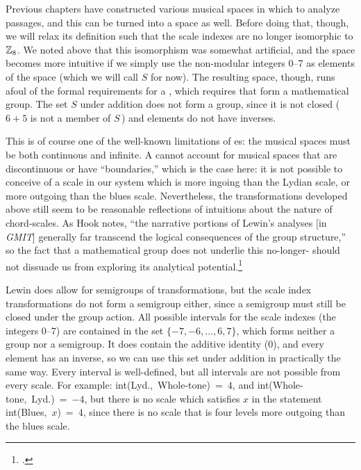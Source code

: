 Previous chapters have constructed various musical spaces in which to analyze
passages, and this \gis can be turned into a space as well. Before doing that,
though, we will relax its definition such that the scale indexes are no longer
isomorphic to $\mathbb{Z}_8$. We noted above that this isomorphism was somewhat
artificial, and the space becomes more intuitive if we simply use the
non-modular integers 0--7 as elements of the space (which we will call $S$ for
now). The resulting space, though, runs afoul of the formal requirements for a
\gis, which requires that \ivls form a mathematical group. The set $S$ under
addition does not form a group, since it is not closed ($6+5$ is not a member
of $S$\,) and elements do not have inverses.

This is of course one of the well-known limitations of \gis{}es: the musical
spaces must be both continuous and infinite. A \gis cannot account for
musical spaces that are discontinuous or have ``boundaries,'' which is the
case here: it is not possible to conceive of a scale in our system which is
more ingoing than the Lydian scale, or more outgoing than the blues
scale. Nevertheless, the transformations developed above still seem
to be reasonable reflections of intuitions about the nature of chord-scales.
As Hook notes, ``the narrative portions of Lewin's analyses [in \emph{GMIT}]
generally far transcend the logical consequences of the group structure,'' so
the fact that a mathematical group does not underlie this no-longer-\gis
should not dissuade us from exploring its analytical
potential.\footcite[185]{hook:2007gmit}

Lewin does allow for semigroups of transformations, but the scale index
transformations do not form a semigroup either, since a semigroup must still
be closed under the group action. All possible intervals for the scale indexes
(the integers 0--7) are contained in the set $\{-7, -6, \ldots, 6, 7\}$, which
forms neither a group nor a semigroup. It does contain the additive identity
($0$), and every element has an inverse, so we can use this set under addition
in practically the same way. Every interval is well-defined, but all intervals
are not possible from every scale. For example: \mbox{int(Lyd., Whole-tone) =
  $4$}, and \mbox{int(Whole-tone, Lyd.) = $-4$}, but there is no scale which
satisfies $x$ in the statement \mbox{int(Blues, $x$) = $4$}, since there is no
scale that is four levels more outgoing than the blues scale.

